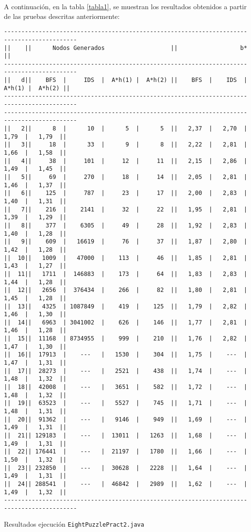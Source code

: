 \documentclass[a4paper, 10pt]{article}
\begin{document}
A continuación, en la tabla \ref{tabla1}, se muestran los resultados obtenidos a partir de las pruebas descritas anteriormente:
\begin{table}[H]
\centering
\begin{BVerbatim}[fontsize=\footnotesize]
-------------------------------------------------------------------------------------------
||    ||      Nodos Generados                   ||                  b*                   ||
-------------------------------------------------------------------------------------------
||   d||    BFS  |     IDS  |  A*h(1) |  A*h(2) ||    BFS  |    IDS  |  A*h(1) |  A*h(2) ||
-------------------------------------------------------------------------------------------
-------------------------------------------------------------------------------------------
||   2||      8  |      10  |      5  |      5  ||   2,37  |   2,70  |   1,79  |   1,79  ||
||   3||     18  |      33  |      9  |      8  ||   2,22  |   2,81  |   1,66  |   1,58  ||
||   4||     38  |     101  |     12  |     11  ||   2,15  |   2,86  |   1,49  |   1,45  ||
||   5||     69  |     270  |     18  |     14  ||   2,05  |   2,81  |   1,46  |   1,37  ||
||   6||    125  |     787  |     23  |     17  ||   2,00  |   2,83  |   1,40  |   1,31  ||
||   7||    216  |    2141  |     32  |     22  ||   1,95  |   2,81  |   1,39  |   1,29  ||
||   8||    377  |    6305  |     49  |     28  ||   1,92  |   2,83  |   1,40  |   1,28  ||
||   9||    609  |   16619  |     76  |     37  ||   1,87  |   2,80  |   1,42  |   1,28  ||
||  10||   1009  |   47000  |    113  |     46  ||   1,85  |   2,81  |   1,43  |   1,27  ||
||  11||   1711  |  146883  |    173  |     64  ||   1,83  |   2,83  |   1,44  |   1,28  ||
||  12||   2656  |  376434  |    266  |     82  ||   1,80  |   2,81  |   1,45  |   1,28  ||
||  13||   4325  | 1087849  |    419  |    125  ||   1,79  |   2,82  |   1,46  |   1,30  ||
||  14||   6963  | 3041002  |    626  |    146  ||   1,77  |   2,81  |   1,46  |   1,28  ||
||  15||  11168  | 8734955  |    999  |    210  ||   1,76  |   2,82  |   1,47  |   1,30  ||
||  16||  17913  |    ---   |   1530  |    304  ||   1,75  |    ---  |   1,47  |   1,31  ||
||  17||  28273  |    ---   |   2521  |    438  ||   1,74  |    ---  |   1,48  |   1,32  ||
||  18||  42008  |    ---   |   3651  |    582  ||   1,72  |    ---  |   1,48  |   1,32  ||
||  19||  63523  |    ---   |   5527  |    745  ||   1,71  |    ---  |   1,48  |   1,31  ||
||  20||  91362  |    ---   |   9146  |    949  ||   1,69  |    ---  |   1,49  |   1,31  ||
||  21|| 129183  |    ---   |  13011  |   1263  ||   1,68  |    ---  |   1,49  |   1,31  ||
||  22|| 176441  |    ---   |  21197  |   1780  ||   1,66  |    ---  |   1,50  |   1,32  ||
||  23|| 232850  |    ---   |  30628  |   2228  ||   1,64  |    ---  |   1,49  |   1,31  ||
||  24|| 288541  |    ---   |  46842  |   2989  ||   1,62  |    ---  |   1,49  |   1,32  ||
------------------------------------------------------------------------------------------- 
      \end{BVerbatim}
      \caption{\label{tabla1} Resultados ejecución \texttt{EightPuzzlePract2.java}}
\end{table}
\end{document}
